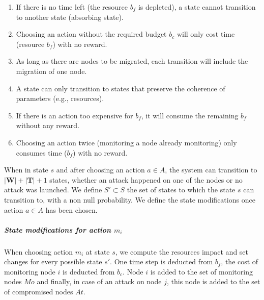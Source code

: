 \begin{enumerate}
    \item If there is no time left (\ie the resource $b_f$ is depleted), a state cannot transition to another state (absorbing state).
    \label{cond:c1}
    \item Choosing an action without the required budget $b_c$ will only cost time (resource $b_f$) with no reward.
    \label{cond:c2}
    \item As long as there are nodes to be migrated, each transition will include the migration of one node.
    \label{cond:c3}
    \item A state can only transition to states that preserve the coherence of parameters (e.g., resources).
    \label{cond:c4}
    \item If there is an action too expensive for $b_f$, it will consume the remaining $b_f$ without any reward.
    \label{cond:c5}
    \item Choosing an action twice (\ie monitoring a node already monitoring) only consumes time ($b_f$) with no reward.
    \label{cond:c6}
 \end{enumerate}


When in state $s$ and after choosing an action $a \in A$, the system can transition to $|\textbf{W}|+|\textbf{T}| + 1 $ states, whether an attack happened on one of the nodes or no attack was launched.
We define $S' \subset S$ the set of states to which the state $s$ can transition to, with a non null probability.
We define the state modifications once action $a \in A$ has been chosen.
\\
\subparagraph*{\textbf{State modifications for action $m_i$}}
When choosing action $m_i$ at state $s$, we compute the resources impact and set changes for every possible state $s'$. One time step is deducted from $b_f$, the cost of monitoring node $i$ is deducted from $b_c$. Node $i$ is added to the set of monitoring nodes $Mo$ and finally, in case of an attack on node $j$, this node is added to the set of compromised nodes $At$.

